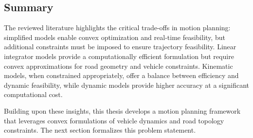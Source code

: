 \subsection{Summary}

The reviewed literature highlights the critical trade-offs in motion planning: simplified models enable convex optimization and real-time
feasibility, but additional constraints must be imposed to ensure trajectory feasibility.
Linear integrator models provide a computationally efficient formulation but require convex approximations for road geometry and vehicle constraints.
Kinematic models, when constrained appropriately, offer a balance between efficiency and dynamic feasibility, while dynamic models provide higher
accuracy at a significant computational cost.

Building upon these insights, this thesis develops a motion planning framework that leverages convex formulations of vehicle dynamics and road
topology constraints.
The next section formalizes this problem statement.

